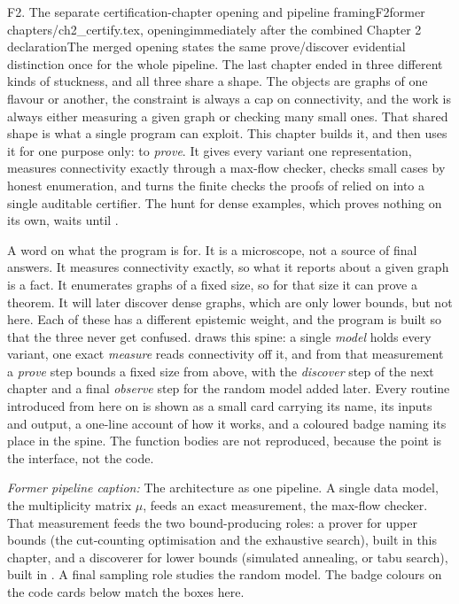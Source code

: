 \begin{offcutrewrite}{F2. The separate certification-chapter opening and pipeline framing}{F2}{former chapters/ch2\_certify.tex, opening}{immediately after the combined Chapter 2 declaration}{The merged opening states the same prove/discover evidential distinction once for the whole pipeline.}
The last chapter ended in three different kinds of stuckness, and all three share a shape. The objects are graphs of one flavour or another, the constraint is always a cap on connectivity, and the work is always either measuring a given graph or checking many small ones. That shared shape is what a single program can exploit. This chapter builds it, and then uses it for one purpose only: to \emph{prove}. It gives every variant one representation, measures connectivity exactly through a max-flow checker, checks small cases by honest enumeration, and turns the finite checks the proofs of  relied on into a single auditable certifier. The hunt for dense examples, which proves nothing on its own, waits until .

A word on what the program is for. It is a microscope, not a source of final answers. It measures connectivity exactly, so what it reports about a given graph is a fact. It enumerates graphs of a fixed size, so for that size it can prove a theorem. It will later discover dense graphs, which are only lower bounds, but not here. Each of these has a different epistemic weight, and the program is built so that the three never get confused.  draws this spine: a single \emph{model} holds every variant, one exact \emph{measure} reads connectivity off it, and from that measurement a \emph{prove} step bounds a fixed size from above, with the \emph{discover} step of the next chapter and a final \emph{observe} step for the random model added later. Every routine introduced from here on is shown as a small card carrying its name, its inputs and output, a one-line account of how it works, and a coloured badge naming its place in the spine. The function bodies are not reproduced, because the point is the interface, not the code.

\noindent\emph{Former pipeline caption:}
The architecture as one pipeline. A single data model, the multiplicity matrix $\mu$, feeds an exact measurement, the max-flow checker. That measurement feeds the two bound-producing roles: a prover for upper bounds (the cut-counting optimisation and the exhaustive search), built in this chapter, and a discoverer for lower bounds (simulated annealing, or tabu search), built in . A final sampling role studies the random model. The badge colours on the code cards below match the boxes here.


\end{offcutrewrite}
